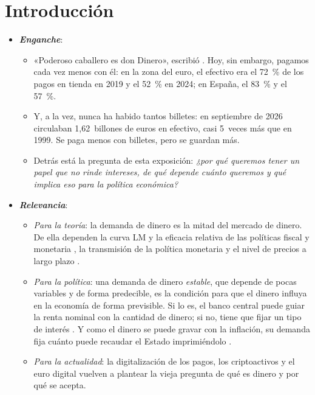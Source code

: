 \documentclass[11pt]{article}
\begin{document}
\tceetitulo

\section*{Introducción}

\begin{itemize}
\item \textbf{\emph{Enganche}}:
  \begin{itemize}
  \item «Poderoso caballero es don Dinero», escribió . Hoy, sin embargo, pagamos cada vez menos con él: en la zona del euro, el efectivo era el 72~\% de los pagos en tienda en 2019 y el 52~\% en 2024; en España, el 83~\% y el 57~\%\nocite{BCE2024SPACE}.
  \item Y, a la vez, nunca ha habido tantos billetes: en septiembre de 2026 circulaban 1,62~billones de euros en efectivo, casi 5~veces más que en 1999\nocite{BCE2026BSI}. Se paga menos con billetes, pero se guardan más.
  \item Detrás está la pregunta de esta exposición: \emph{¿por qué queremos tener un papel que no rinde intereses, de qué depende cuánto queremos y qué implica eso para la política económica?}
  \end{itemize}

\item \textbf{\emph{Relevancia}}:
  \begin{itemize}
  \item \emph{Para la teoría}: la demanda de dinero es la mitad del mercado de dinero. De ella dependen la curva LM y la eficacia relativa de las políticas fiscal y monetaria , la transmisión de la política monetaria  y el nivel de precios a largo plazo .
  \item \emph{Para la política}: una demanda de dinero \emph{estable}, que depende de pocas variables y de forma predecible, es la condición para que el dinero influya en la economía de forma previsible. Si lo es, el banco central puede guiar la renta nominal con la cantidad de dinero; si no, tiene que fijar un tipo de interés . Y como el dinero se puede gravar con la inflación, su demanda fija cuánto puede recaudar el Estado imprimiéndolo .
  \item \emph{Para la actualidad}: la digitalización de los pagos, los criptoactivos y el euro digital vuelven a plantear la vieja pregunta de qué es dinero y por qué se acepta.
  \end{itemize}


\end{itemize}
\end{document}
